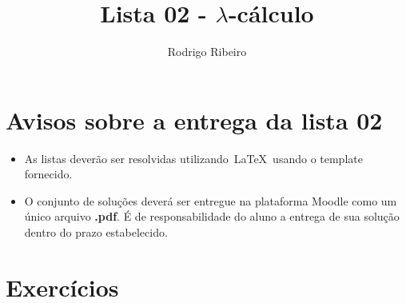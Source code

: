 \documentclass[a4paper]{article}
\theoremstyle{definition}
\begin{document}
  \title{Lista 02 - $\lambda$-cálculo}
  \author{Rodrigo Ribeiro}

  \maketitle


  \pagestyle{fancy}

  \section*{Avisos sobre a entrega da lista 02}

  \begin{itemize}
    \item As listas deverão ser resolvidas utilizando~\LaTeX~usando o template fornecido.
    \item O conjunto de soluções deverá ser entregue na plataforma Moodle como um único
        arquivo \textbf{.pdf}. É de responsabilidade do aluno a entrega de sua solução dentro do
        prazo estabelecido.
  \end{itemize}

  \section*{Exercícios}
\end{document}
